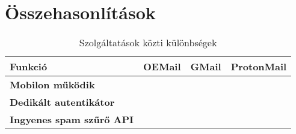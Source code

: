 ﻿\chapter{Összehasonlítások}


\newcommand{\contains}{\textcolor{green!70}{\faCheckCircle}}
\newcommand{\notContains}{\textcolor{red!70}{\faTimesCircle}}

\begin{table}[!ht]
    \centering
    \begin{tabularx}{\linewidth}{|>{\bfseries\centering}m{2.5cm}|m{3cm}|m{3cm}|X|}
    \hline
        \textbf{Funkció} & \textbf{OEMail} & \textbf{GMail} & \textbf{ProtonMail} \\
    \hline
        Mobilon működik & \contains & \contains & \contains \\ \hline
        Dedikált autentikátor & \contains & \contains & \notContains \\ \hline
        Ingyenes spam szűrő API & \contains & \notContains & \notContains \\ \hline
    \end{tabularx}
    \caption{Szolgáltatások közti különbségek}
    \label{szolg}
\end{table}
